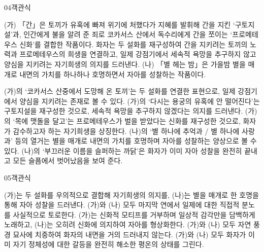 \documentclass[fs85,seriesWit]{korfarm-base}
\begin{document}
\begin{kfQBlock}{04}{객관식}
\begin{kfEvidence}(가) 「간」은 토끼가 유혹에 빠져 위기에 처했다가 지혜를 발휘해 간을 지킨 ‘구토지설’과, 인간에게 불을 알려 준 죄로 코카서스 산에서 독수리에게 간을 쪼이는 ‘프로메테우스 신화’를 결합한 작품이다. 화자는 두 설화를 재구성하여 간을 지키려는 토끼의 노력과 프로메테우스의 희생을 연결하고, 일제 강점기에서 세속적 욕망을 추구하지 않고 양심을 지키려는 자기희생의 의지를 드러낸다. (나) 「별 헤는 밤」은 가을밤 별을 매개로 내면의 가치를 하나하나 호명하면서 자아를 성찰하는 작품이다.\end{kfEvidence}
\begin{kfChoices}
\kfChoice (가)의 ‘코카서스 산중에서 도망해 온 토끼’는 두 설화를 연결한 표현으로, 일제 강점기에서 양심을 지키려는 존재로 볼 수 있다.
\kfChoice (가)의 ‘다시는 용궁의 유혹에 안 떨어진다’는 구토지설을 재구성한 것으로, 세속적 욕망을 추구하지 않겠다는 의지를 드러낸다.
\kfChoice (가)의 ‘목에 맷돌을 달고’는 프로메테우스가 벌을 받았다는 신화를 재구성한 것으로, 화자가 감수하고자 하는 자기희생을 상징한다.
\kfChoice (나)의 ‘별 하나에 추억과 / 별 하나에 사랑과’ 등의 열거는 별을 매개로 내면의 가치를 호명하며 자아를 성찰하는 양상으로 볼 수 있다.
\kfChoice (나)의 ‘부끄러운 이름을 슬퍼하는 까닭’은 화자가 이미 자아 성찰을 완전히 끝내고 모든 슬픔에서 벗어났음을 보여 준다.
\end{kfChoices}
\end{kfQBlock}

\begin{kfQBlock}{05}{객관식}
\begin{kfChoices}
\kfChoice (가)는 두 설화를 우의적으로 결합해 자기희생의 의지를, (나)는 별을 매개로 한 호명을 통해 자아 성찰을 드러낸다.
\kfChoice (가)와 (나) 모두 마지막 연에서 일제에 대한 직접적 분노를 사실적으로 토로한다.
\kfChoice (가)는 신화적 모티프를 거부하며 일상적 감각만을 담백하게 노래하고, (나)는 오히려 신화에 의지하여 자아를 형상화한다.
\kfChoice (가)와 (나) 모두 자연 풍경 묘사에 치중하여 화자의 내면을 거의 드러내지 않는다.
\kfChoice (가)와 (나) 모두 화자가 이미 자기 정체성에 대한 갈등을 완전히 해소한 평온의 상태를 그린다.
\end{kfChoices}
\end{kfQBlock}

\kfEndMC
\end{document}
